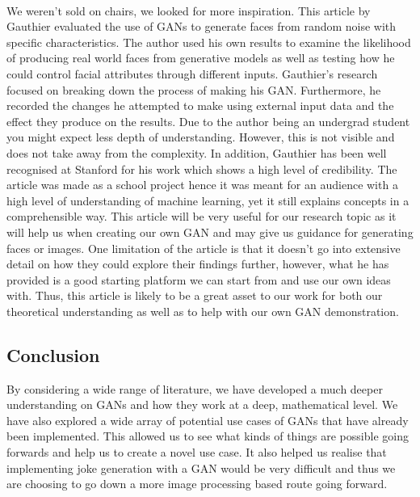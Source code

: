 \documentclass{article}
\begin{document}
\paragraph{}
We weren't sold on chairs, we looked for more inspiration. This article\cite{faces} by Gauthier evaluated the use of GANs to generate faces from random noise with specific characteristics. The author used his own results to examine the likelihood of producing real world faces from generative models as well as testing how he could control facial attributes through different inputs. Gauthier's research focused on breaking down the process of making his GAN. Furthermore, he recorded the changes he attempted to make using external input data and the effect they produce on the results. Due to the author being an undergrad student you might expect less depth of understanding. However, this is not visible and does not take away from the complexity. In addition, Gauthier has been well recognised at Stanford for his work which shows a high level of credibility. The article was made as a school project hence it was meant for an audience with a high level of understanding of machine learning, yet it still explains concepts in a comprehensible way. This article will be very useful for our research topic as it will help us when creating our own GAN and may give us guidance for generating faces or images. One limitation of the article is that it doesn't go into extensive detail on how they could explore their findings further, however, what he has provided is a good starting platform we can start from and use our own ideas with. Thus, this article is likely to be a great asset to our work for both our theoretical understanding as well as to help with our own GAN demonstration.

\subsection{Conclusion}
By considering a wide range of literature, we have developed a much deeper understanding on GANs and how they work at a deep, mathematical level. We have also explored a wide array of potential use cases of GANs that have already been implemented. This allowed us to see what kinds of things are possible going forwards and help us to create a novel use case. It also helped us realise that implementing joke generation with a GAN would be very difficult and thus we are choosing to go down a more image processing based route going forward.



\end{document}

